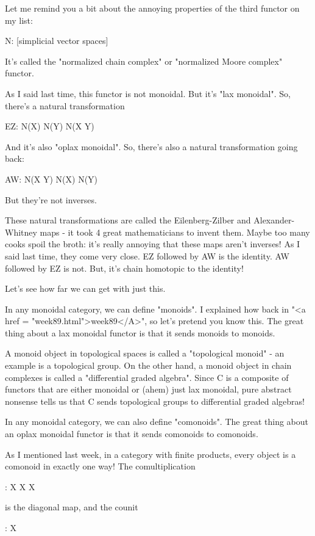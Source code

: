 Let me remind you a bit about the annoying properties of the third
functor on my list:

N: [simplicial vector spaces] 

It's called the "normalized chain complex" or
"normalized Moore complex" functor.

As I said last time, this functor is not monoidal.  But it's "lax
monoidal".  So, there's a natural transformation

EZ: N(X) \otimes  N(Y) \to  N(X \times  Y)

And it's also "oplax monoidal".  So, there's also a
natural transformation going back:

AW: N(X \times  Y) \to  N(X) \otimes  N(Y)

But they're not inverses.

These natural transformations are called the Eilenberg-Zilber and
Alexander-Whitney maps - it took 4 great mathematicians to invent
them.  Maybe too many cooks spoil the broth: it's really annoying that
these maps aren't inverses!  As I said last time, they come very
close.  EZ followed by AW is the identity.  AW followed by EZ is not.
But, it's chain homotopic to the identity!

Let's see how far we can get with just this.

In any monoidal category, we can define "monoids".  I
explained how back in "<a href = "week89.html">week89</A>",
so let's pretend you know this.  The great thing about a lax monoidal
functor is that it sends monoids to monoids.

A monoid object in topological spaces is called a "topological
monoid" - an example is a topological group.  On the other hand,
a monoid object in chain complexes is called a "differential
graded algebra".  Since C is a composite of functors that are
either monoidal or (ahem) just lax monoidal, pure abstract nonsense
tells us that C sends topological groups to differential graded
algebras!

In any monoidal category, we can also define "comonoids".
The great thing about an oplax monoidal functor is that it sends
comonoids to comonoids.

As I mentioned last week, in a category with finite products, every
object is a comonoid in exactly one way!  The comultiplication

\Delta : X \to  X \times  X

is the diagonal map, and the counit

\epsilon : X 

